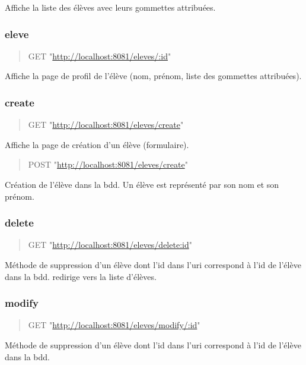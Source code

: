 \documentclass[11pt]{article}
\begin{document}
Affiche la liste des élèves avec leurs gommettes attribuées.

\subsubsection{eleve}
\label{sec:orga8dd810}

\begin{quote}
GET "\url{http://localhost:8081/eleves/:id}"
\end{quote}

Affiche la page de profil de l'élève (nom, prénom, liste des gommettes attribuées).

\subsubsection{create}
\label{sec:org1a604fa}

\begin{quote}
GET "\url{http://localhost:8081/eleves/create}"
\end{quote}

Affiche la page de création d'un élève (formulaire).

\begin{quote}
POST "\url{http://localhost:8081/eleves/create}"
\end{quote}

Création de l'élève dans la bdd. Un élève est représenté par son nom et son prénom.

\subsubsection{delete}
\label{sec:org133c1a7}

\begin{quote}
GET "\url{http://localhost:8081/eleves/delete:id}"
\end{quote}

Méthode de suppression d'un élève dont l'id dans l'uri correspond à l'id de l'élève dans la bdd.
redirige vers la liste d'élèves.

\subsubsection{modify}
\label{sec:org7f22fc5}

\begin{quote}
GET "\url{http://localhost:8081/eleves/modify/:id}"
\end{quote}

Méthode de suppression d'un élève dont l'id dans l'uri correspond à l'id de l'élève dans la bdd.
\end{document}
